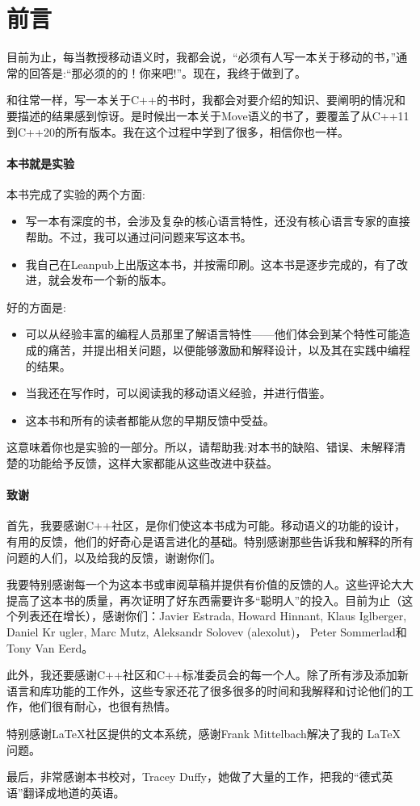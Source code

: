 \chapter{前言}

目前为止，每当教授移动语义时，我都会说，“必须有人写一本关于移动的书，”通常的回答是:“那必须的的！你来吧!”。现在，我终于做到了。

和往常一样，写一本关于C++的书时，我都会对要介绍的知识、要阐明的情况和要描述的结果感到惊讶。是时候出一本关于Move语义的书了，要覆盖了从C++11到C++20的所有版本。我在这个过程中学到了很多，相信你也一样。

\subsubsection{本书就是实验}

本书完成了实验的两个方面:
\begin{itemize}
	\item 写一本有深度的书，会涉及复杂的核心语言特性，还没有核心语言专家的直接帮助。不过，我可以通过问问题来写这本书。
	\item 我自己在Leanpub上出版这本书，并按需印刷。这本书是逐步完成的，有了改进，就会发布一个新的版本。
\end{itemize}

好的方面是:
\begin{itemize}
	\item 可以从经验丰富的编程人员那里了解语言特性——他们体会到某个特性可能造成的痛苦，并提出相关问题，以便能够激励和解释设计，以及其在实践中编程的结果。
	\item 当我还在写作时，可以阅读我的移动语义经验，并进行借鉴。
	\item 这本书和所有的读者都能从您的早期反馈中受益。
\end{itemize}

这意味着你也是实验的一部分。所以，请帮助我:对本书的缺陷、错误、未解释清楚的功能给予反馈，这样大家都能从这些改进中获益。

\subsubsection{致谢}

首先，我要感谢C++社区，是你们使这本书成为可能。移动语义的功能的设计，有用的反馈，他们的好奇心是语言进化的基础。特别感谢那些告诉我和解释的所有问题的人们，以及给我的反馈，谢谢你们。

我要特别感谢每一个为这本书或审阅草稿并提供有价值的反馈的人。这些评论大大提高了这本书的质量，再次证明了好东西需要许多“聪明人”的投入。目前为止（这个列表还在增长），感谢你们：Javier Estrada, Howard Hinnant, Klaus Iglberger, Daniel Kr ugler, Marc Mutz, Aleksandr Solovev (alexolut)， Peter Sommerlad和Tony Van Eerd。

此外，我还要感谢C++社区和C++标准委员会的每一个人。除了所有涉及添加新语言和库功能的工作外，这些专家还花了很多很多的时间和我解释和讨论他们的工作，他们很有耐心，也很有热情。

特别感谢LaTeX社区提供的文本系统，感谢Frank Mittelbach解决了我的 \LaTeX{} 问题。

最后，非常感谢本书校对，Tracey Duffy，她做了大量的工作，把我的“德式英语”翻译成地道的英语。


















